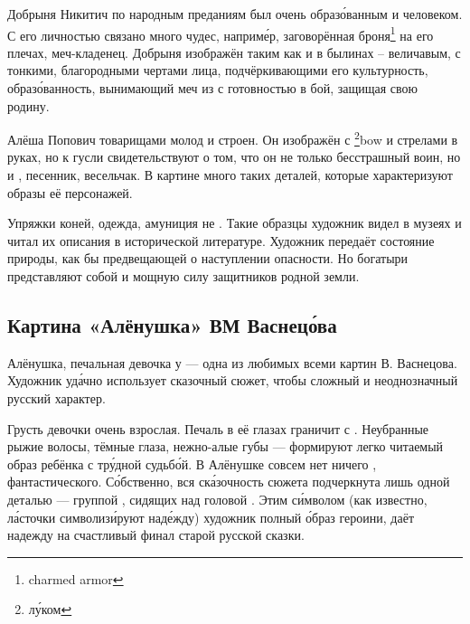 Добрыня Никитич по народным преданиям был очень образ\'{о}ванным и  человеком. С его личностью связано много чудес, наприм\'{е}р, заговорённая броня\footnote{charmed armor} на его плечах,  меч-кладенец. Добрыня изображён таким как и в былинах -- величавым, с тонкими, благородными чертами лица, подчёркивающими его культурность, образ\'{о}ванность,  вынимающий меч из  с готовностью  в бой, защищая свою родину.

Алёша Попович  товарищами молод и строен. Он изображён с \footnote{л\'{у}ком}{bow} и стрелами в руках, но  к  гусли свидетельствуют о том, что он не только бесстрашный воин, но и , песенник, весельчак. В картине много таких деталей, которые характеризуют образы её персонажей.

Упряжки коней, одежда, амуниция не . Такие образцы художник видел в музеях и читал их описания в исторической литературе. Художник  передаёт состояние природы, как бы предвещающей о наступлении опасности. Но богатыри представляют собой  и мощную силу защитников родной земли.




\subsection{Картина «Алёнушка» ВМ Васнец\'{о}ва}

Алёнушка, печальная девочка у  --- одна из любимых всеми картин В. Васнецова. Художник уд\'{а}чно использует сказочный сюжет, чтобы  сложный и неоднозначный русский характер.

Грусть девочки очень взрослая. Печаль в её глазах граничит с . Неубранные рыжие волосы, тёмные глаза, нежно-алые губы --- формируют легко читаемый образ ребёнка с тр\'{у}дной судьб\'{о}й.
В Алёнушке совсем нет ничего , фантастического.
С\'{о}бственно, вся ск\'{а}зочность сюжета подчеркнута лишь одной деталью --- группой , сидящих над головой . Этим с\'{и}мволом (как известно, л\'{а}сточки символиз\'{и}руют над\'{е}жду) художник  полный  \'{о}браз героини, даёт надежду на счастливый финал старой русской сказки.

